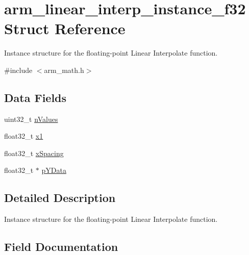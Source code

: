 \hypertarget{structarm__linear__interp__instance__f32}{}\section{arm\+\_\+linear\+\_\+interp\+\_\+instance\+\_\+f32 Struct Reference}
\label{structarm__linear__interp__instance__f32}


Instance structure for the floating-\/point Linear Interpolate function.  




{\ttfamily \#include $<$arm\+\_\+math.\+h$>$}

\subsection*{Data Fields}
\begin{DoxyCompactItemize}
\item 
uint32\+\_\+t \mbox{\hyperlink{structarm__linear__interp__instance__f32_a2ea653b0599388e9a72ebab9841707ba}{n\+Values}}
\item 
float32\+\_\+t \mbox{\hyperlink{structarm__linear__interp__instance__f32_a795ed79ea4c18d52afe5eb5e868e1c5a}{x1}}
\item 
float32\+\_\+t \mbox{\hyperlink{structarm__linear__interp__instance__f32_a08675584bb57fc42bbb3739c13674346}{x\+Spacing}}
\item 
float32\+\_\+t $\ast$ \mbox{\hyperlink{structarm__linear__interp__instance__f32_af1489866b69eb5db1e0afeb24c7b01e9}{p\+Y\+Data}}
\end{DoxyCompactItemize}


\subsection{Detailed Description}
Instance structure for the floating-\/point Linear Interpolate function. 

\subsection{Field Documentation}
\mbox{\label{structarm__linear__interp__instance__f32_a2ea653b0599388e9a72ebab9841707ba}} 
